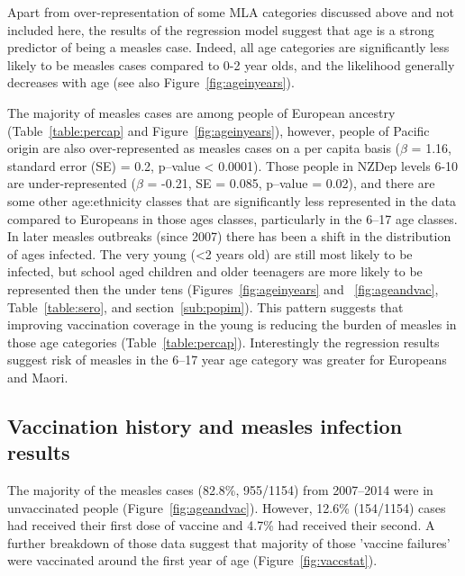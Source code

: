 \documentclass{article}
\begin{document}
\par Apart from over-representation of some MLA categories discussed above and not included here, the results of the regression model suggest that age is a strong predictor of being a measles case. Indeed, all age categories are significantly less likely to be measles cases compared to 0-2 year olds, and the likelihood generally decreases with age (see also Figure~\autoref{fig:ageinyears}).

The majority of measles cases are among people of European ancestry (Table~\autoref{table:percap} and Figure~\autoref{fig:ageinyears}), however, people of Pacific origin are also over-represented as measles cases on a per capita basis ($\beta$ = 1.16, standard error (SE) = 0.2, p--value < 0.0001). Those people in NZDep levels 6-10 are under-represented ($\beta$ = -0.21, SE = 0.085, p--value = 0.02), and there are some other age:ethnicity classes that are significantly less represented in the data compared to Europeans in those ages classes, particularly in the 6--17 age classes. In later measles outbreaks (since 2007) there has been a shift in the distribution of ages infected. The very young (<2 years old) are still most likely to be infected, but school aged children and older teenagers are more likely to be represented then the under tens (Figures~\autoref{fig:ageinyears} and ~\autoref{fig:ageandvac}, Table~\autoref{table:sero}, and section~\autoref{sub:popim}). This pattern suggests that improving vaccination coverage in the young is reducing the burden of measles in those age categories (Table~\autoref{table:percap}). Interestingly the regression results suggest risk of measles in the 6--17 year age category was greater for Europeans and Maori.

\subsection{Vaccination history and measles infection results}

The majority of the measles cases (82.8\%, 955/1154) from 2007--2014 were in unvaccinated people (Figure~\autoref{fig:ageandvac}). However, 12.6\% (154/1154) cases had received their first dose of vaccine and 4.7\% had received their second. A further breakdown of those data suggest that majority of those 'vaccine failures' were vaccinated around the first year of age (Figure~\autoref{fig:vaccstat}).
\end{document}
